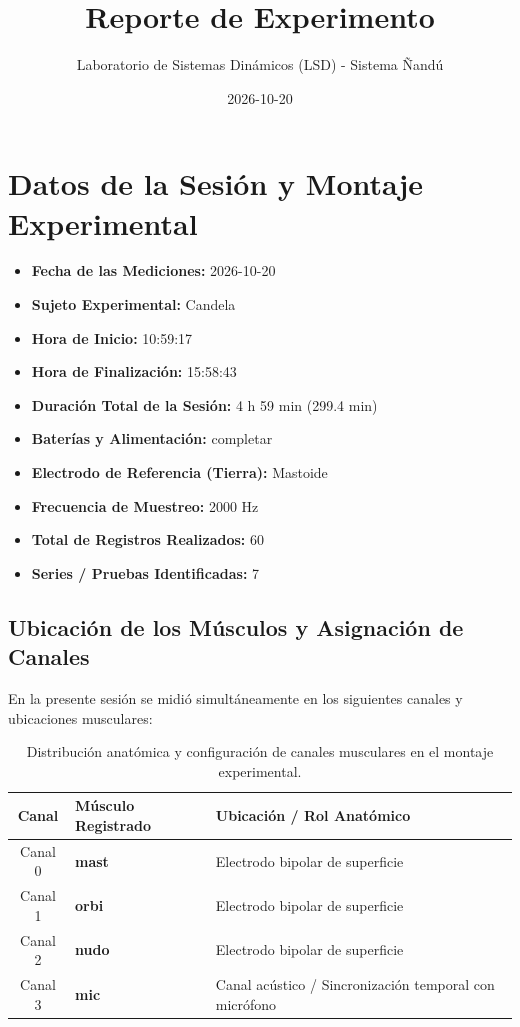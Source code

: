 \documentclass[11pt,a4paper]{article}
\title{\textbf{Reporte de Experimento}}
\author{Laboratorio de Sistemas Dinámicos (LSD) - Sistema Ñandú}
\date{2026-10-20}
\begin{document}
\maketitle

\section{Datos de la Sesión y Montaje Experimental}
\begin{itemize}
    \item \textbf{Fecha de las Mediciones:} 2026-10-20
    \item \textbf{Sujeto Experimental:} Candela
    \item \textbf{Hora de Inicio:} 10:59:17
    \item \textbf{Hora de Finalización:} 15:58:43
    \item \textbf{Duración Total de la Sesión:} 4 h 59 min (299.4 min)
    \item \textbf{Baterías y Alimentación:} completar
    \item \textbf{Electrodo de Referencia (Tierra):} Mastoide
    \item \textbf{Frecuencia de Muestreo:} 2000 Hz
    \item \textbf{Total de Registros Realizados:} 60
    \item \textbf{Series / Pruebas Identificadas:} 7
\end{itemize}

\subsection{Ubicación de los Músculos y Asignación de Canales}
En la presente sesión se midió simultáneamente en los siguientes canales y ubicaciones musculares:
\begin{table}[H]
\centering
\begin{tabularx}{\textwidth}{c p{6.5cm} X}
\toprule
\textbf{Canal} & \textbf{Músculo Registrado} & \textbf{Ubicación / Rol Anatómico} \\
\midrule
Canal 0 & \textbf{mast} & Electrodo bipolar de superficie \\
Canal 1 & \textbf{orbi} & Electrodo bipolar de superficie \\
Canal 2 & \textbf{nudo} & Electrodo bipolar de superficie \\
Canal 3 & \textbf{mic} & Canal acústico / Sincronización temporal con micrófono \\
\bottomrule
\end{tabularx}
\caption{Distribución anatómica y configuración de canales musculares en el montaje experimental.}
\end{table}
\end{document}
